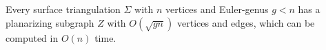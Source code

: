\begin{thm}[\citet{10.5555/644108.644208}]\label{Eppstein}
Every surface triangulation $\Sigma$ with $n$ vertices and Euler-genus $g < n$ has a planarizing subgraph $Z$ with $O(\sqrt{gn})$ vertices and edges, which can be computed in $O(n)$ time.
\end{thm}

